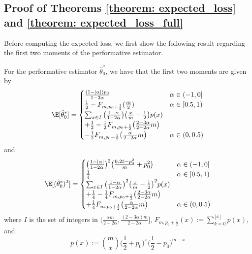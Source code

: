 \subsection{Proof of Theorems \ref{theorem: expected_loss} and \ref{theorem:
expected_loss_full}}

Before computing the expected loss, we first show the following result
regarding the first two moments of the performative estimator.

\begin{lemma} \label{lemma: moments}
    For the performative estimator $\hat{\theta}_0^\ast$, we have that the
    first two moments are given by
    \begin{equation*}
        \E[\hat{\theta}_0^\ast] = 
        \begin{cases}
            \frac{(1 - |\alpha|) p_0}{1-2\alpha} & \alpha \in (-1, 0]\\
            \frac12 - F_{m, p_0 + \frac12} (\frac{m}{2}) & \alpha \in [0.5,
            1)\\
            \sum_{x \in I} \big(\frac{1 - \alpha}{1-2\alpha}\big)
            \big(\frac{x}{m} - \frac12 \big) p(x) & \\
            + \frac12  - \frac12 F_{m, p_0 + \frac12}\big( \frac{2 -
            3\alpha}{2-2\alpha}m \big) & \\
            - \frac12 F_{m, p_0 + \frac12}\big( \frac{\alpha }{2-2\alpha}m\big)
            & \alpha \in (0, 0.5)
        \end{cases}
    \end{equation*}
    and 
    \begin{equation*}
        \E[(\hat{\theta}_0^\ast)^2] = 
        \begin{cases}
            \big( \frac{1-|\alpha|}{1-2\alpha}\big)^2 \big( \frac{0.25 -
            p_0^2}{m} + p_0^2 \big) & \alpha \in (-1, 0]\\
            \frac14 & \alpha \in [0.5, 1)\\
            \sum_{x \in I} \big(\frac{1 - \alpha}{1-2\alpha}\big)^2
            \big(\frac{x}{m} - \frac12 \big)^2 p(x)  & \\
            + \frac14  - \frac14 F_{m, p_0 + \frac12}\big( \frac{2 -
            3\alpha}{2-2\alpha}m \big) & \\
            + \frac14 F_{m, p_0 + \frac12}\big( \frac{\alpha }{2-2\alpha}m\big)
            & \alpha \in (0, 0.5)
        \end{cases}
    \end{equation*}
    where $I$ is the set of integers in $\big(\frac{\alpha m}{2-2\alpha},
    \frac{(2-3\alpha)m}{2-2\alpha} \big]$, $F_{m, p_0 + \frac12} (x) :=
    \sum_{k=0}^{\lfloor x \rfloor} p(x),$ and
    \begin{equation*}
        p(x) := \binom{m}{x} \bigg(\frac12 + p_0\bigg)^x \bigg(\frac12 -
        p_0\bigg)^{m-x}
    \end{equation*}
\end{lemma}
